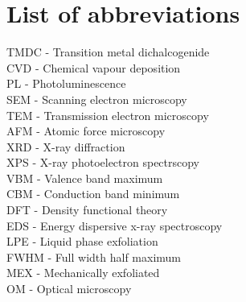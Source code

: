 \section*{List of abbreviations}

TMDC - Transition metal dichalcogenide\\
CVD - Chemical vapour deposition\\
PL - Photoluminescence\\
SEM - Scanning electron microscopy\\
TEM - Transmission electron microscopy\\
AFM - Atomic force microscopy\\
XRD - X-ray diffraction\\
XPS - X-ray photoelectron spectrscopy\\
VBM - Valence band maximum\\
CBM - Conduction band minimum\\
DFT - Density functional theory\\
EDS - Energy dispersive x-ray spectroscopy\\
LPE - Liquid phase exfoliation\\
FWHM - Full width half maximum\\
MEX - Mechanically exfoliated\\
OM - Optical microscopy